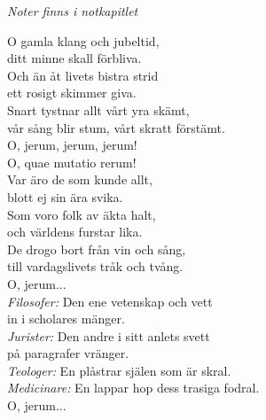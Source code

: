 \documentclass[a6paper,10pt]{article}
\begin{document}
\setlength{\oddsidemargin}{-0.37in}
\noindent
\vspace{20pt} 
\begin{center}
\small \textit{Noter finns i notkapitlet}
\end{center}
O gamla klang och jubeltid,\\
ditt minne skall förbliva.\\
Och än åt livets bistra strid\\
ett rosigt skimmer giva.\\
Snart tystnar allt vårt yra skämt,\\
vår sång blir stum, vårt skratt förstämt.\\
O, jerum, jerum, jerum!\\
O, quae mutatio rerum!
\vspace{5pt}\\
Var äro de som kunde allt,\\
blott ej sin ära svika.\\
Som voro folk av äkta halt,\\
och världens furstar lika.\\
De drogo bort från vin och sång,\\
till vardagslivets tråk och tvång.\\
O, jerum...
\vspace{5pt}\\
\textit{Filosofer:} Den ene vetenskap och vett\\
in i scholares mänger.\\
\textit{Jurister:} Den andre i sitt anlets svett\\
på paragrafer vränger.\\
\textit{Teologer:} En plåstrar själen som är skral.\\
\textit{Medicinare:} En lappar hop dess trasiga fodral.\\
O, jerum...
\end{document}
